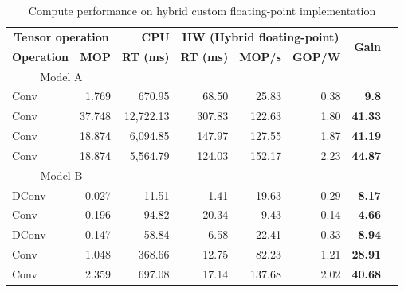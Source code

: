 \begin{table}[!htp]\centering
	\caption{Compute performance on hybrid custom floating-point implementation}\label{tab:performace_float_hybrid }
	\scriptsize
	\begin{tabular}{lrrrrrrr}\toprule
		\multicolumn{2}{c}{\textbf{Tensor operation}} &\textbf{CPU} &\multicolumn{3}{c}{\textbf{HW (Hybrid floating-point)}} &\multirow{2}{*}{\textbf{Gain}} \\\cmidrule{1-6}
		\textbf{Operation} &\textbf{MOP} &\textbf{RT (ms)} &\textbf{RT (ms)} &\textbf{MOP/s} &\textbf{GOP/W} & \\\midrule
		\multicolumn{2}{c}{Model A} & & & & & \\
		Conv &1.769 &670.95 &68.50 &25.83 &0.38 &\textbf{9.8} \\
		Conv &37.748 &12,722.13 &307.83 &122.63 &1.80 &\textbf{41.33} \\
		Conv &18.874 &6,094.85 &147.97 &127.55 &1.87 &\textbf{41.19} \\
		Conv &18.874 &5,564.79 &124.03 &152.17 &2.23 &\textbf{44.87} \\
		\multicolumn{2}{c}{Model B} & & & & & \\
		DConv &0.027 &11.51 &1.41 &19.63 &0.29 &\textbf{8.17} \\
		Conv &0.196 &94.82 &20.34 &9.43 &0.14 &\textbf{4.66} \\
		DConv &0.147 &58.84 &6.58 &22.41 &0.33 &\textbf{8.94} \\
		Conv &1.048 &368.66 &12.75 &82.23 &1.21 &\textbf{28.91} \\
		Conv &2.359 &697.08 &17.14 &137.68 &2.02 &\textbf{40.68} \\
		\bottomrule
	\end{tabular}
\end{table}

